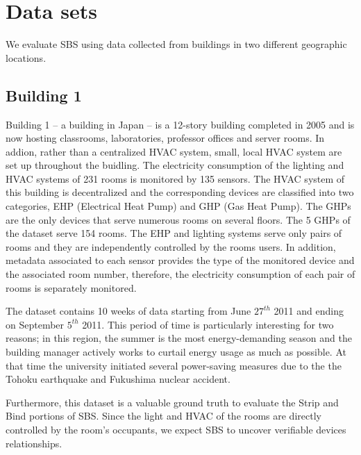 \section{Data sets}
We evaluate SBS using data collected from buildings in two different geographic locations.  

\subsection{Building 1} \label{data:engbldg2}
Building 1 -- a building in Japan -- is a 12-story building completed in 2005 and is now hosting classrooms, laboratories, professor offices 
and server rooms.  In addion, rather than a centralized HVAC system, small, local HVAC system are set up throughout
the buidling.  The electricity consumption of the lighting and HVAC systems of 231 rooms is monitored by 135 sensors.
The HVAC system of this building is decentralized and the corresponding devices are classified into two categories, EHP (Electrical Heat Pump) 
and GHP (Gas Heat Pump).
The GHPs are the only devices that serve numerous rooms on several floors.  The 5 GHPs of the dataset serve 154 rooms.
The EHP and lighting systems serve only pairs of rooms and they are independently controlled by the rooms users.
In addition, metadata associated to each sensor provides the type of the monitored device and the associated room number, 
therefore, the electricity consumption of each pair of rooms is separately monitored.

The dataset contains 10 weeks of data starting from June $27^{th}$ 2011 and ending on September $5^{th}$ 2011.
This period of time is particularly interesting for two reasons; in this region, the summer is the most energy-demanding 
season and the building manager actively works to curtail energy usage as much as possible.
At that time the university initiated several power-saving measures due to the the Tohoku earthquake and Fukushima nuclear accident.

Furthermore, this dataset is a valuable ground truth to evaluate the Strip and Bind portions of SBS.
Since the light and HVAC of the rooms are directly controlled by the room's occupants, we expect SBS to uncover verifiable devices 
relationships.  

